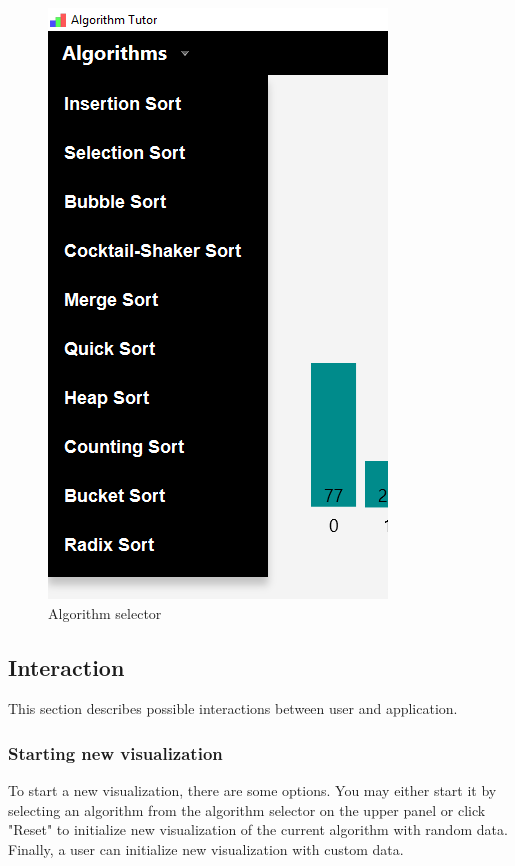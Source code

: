 \documentclass[
  field=inf,
  biblatex,
  language=english,
  glossaries,
  theorems=false,
  index
]{kidiplom}
\begin{document}
\begin{figure}[H]
\begin{center}
	\includegraphics[scale=0.3]{img/ui/Selector.png}
	\caption{Algorithm selector}\label{fig:selector}
\end{center}
\end{figure}

\subsection{Interaction}

This section describes possible interactions between user and application.

\subsubsection{Starting new visualization}
To start a new visualization, there are some options. You may either start it by selecting an algorithm from the algorithm selector on the upper panel or click "Reset" to initialize new visualization of the current algorithm with random data. Finally, a user can initialize new visualization with custom data.
\end{document}
